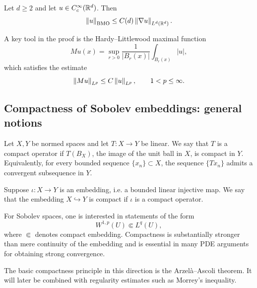 \begin{theorem}
Let $d\ge 2$ and let $u\in C_c^\infty(\mathbb{R}^d)$. Then
\[
\left\lVert u \right\rVert_{\mathrm{BMO}} \le C(d)\left\lVert \nabla u \right\rVert_{L^d(\mathbb{R}^d)}.
\]
\end{theorem}

\begin{remark}
A key tool in the proof is the Hardy--Littlewood maximal function
\[
Mu(x)=\sup_{r>0} \frac{1}{|B_r(x)|}\int_{B_r(x)} |u|,
\]
which satisfies the estimate
\[
\left\lVert Mu \right\rVert_{L^p} \le C\left\lVert u \right\rVert_{L^p}, \qquad 1<p\le \infty.
\]
\end{remark}

\subsection{Compactness of Sobolev embeddings: general notions}

\begin{definition}
Let $X,Y$ be normed spaces and let $T:X\to Y$ be linear. We say that $T$ is a compact operator if $T(B_X)$, the image of the unit ball in $X$, is compact in $Y$. Equivalently, for every bounded sequence $\{x_n\}\subset X$, the sequence $\{Tx_n\}$ admits a convergent subsequence in $Y$.
\end{definition}

\begin{definition}
Suppose $\iota:X\to Y$ is an embedding, i.e. a bounded linear injective map. We say that the embedding $X\hookrightarrow Y$ is compact if $\iota$ is a compact operator.
\end{definition}

\begin{remark}
For Sobolev spaces, one is interested in statements of the form
\[
W^{1,p}(U) \Subset L^q(U),
\]
where $\Subset$ denotes compact embedding. Compactness is substantially stronger than mere continuity of the embedding and is essential in many PDE arguments for obtaining strong convergence.
\end{remark}

\begin{remark}
The basic compactness principle in this direction is the Arzel\`a--Ascoli theorem. It will later be combined with regularity estimates such as Morrey's inequality.
\end{remark}
